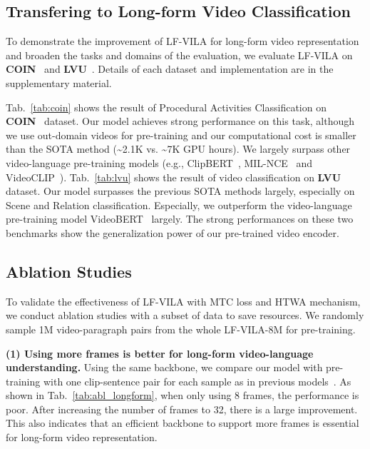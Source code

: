 \documentclass{article}
\begin{document}
\subsection{Transfering to Long-form Video Classification}
To demonstrate the improvement of LF-VILA for long-form video representation and broaden the tasks and domains of the evaluation, we evaluate LF-VILA on \textbf{COIN}~\cite{tang2019coin} and \textbf{LVU}~\cite{wu2021towards-longform}. Details of each dataset and implementation are in the supplementary material.

Tab.~\ref{tab:coin} shows the result of Procedural Activities Classification on \textbf{COIN}~\cite{tang2019coin} dataset. Our model achieves strong performance on this task, although we use out-domain videos for pre-training and our computational cost is smaller than the SOTA method (\textasciitilde 2.1K vs. \textasciitilde 7K GPU hours). We largely surpass other video-language pre-training models (e.g., ClipBERT~\cite{lei2021clipbert}, MIL-NCE~\cite{miech2020milnce} and VideoCLIP~\cite{xu2021videoclip}). 
Tab.~\ref{tab:lvu} shows the result of video classification on \textbf{LVU}~\cite{wu2021towards-longform} dataset. Our model surpasses the previous SOTA methods largely, especially on Scene and Relation classification. Especially, we outperform the video-language pre-training model VideoBERT~\cite{sun2019videobert} largely. 
The strong performances on these two benchmarks show the generalization power of our pre-trained video encoder.

\subsection{Ablation Studies}
To validate the effectiveness of LF-VILA with MTC loss and HTWA mechanism, we conduct ablation studies with a subset of data to save resources. We randomly sample 1M video-paragraph pairs from the whole LF-VILA-8M for pre-training.

\textbf{(1) Using more frames is better for long-form video-language understanding.}
Using the same backbone, we compare our model with pre-training with one clip-sentence pair for each sample as in previous models~\cite{bain2021frozen,bain2021frozen}. As shown in Tab.~\ref{tab:abl_longform}, when only using 8 frames, the performance is poor. After increasing the number of frames to 32, there is a large improvement. This also indicates that an efficient backbone to support more frames is essential for long-form video representation.
\end{document}
